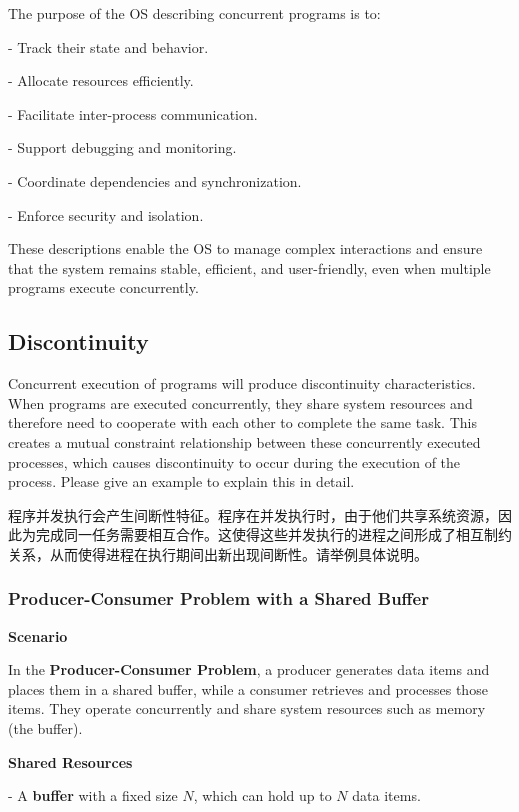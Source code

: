 \documentclass[a4paper]{book}
\begin{document}
The purpose of the OS describing concurrent programs is to:

- Track their state and behavior.

- Allocate resources efficiently.

- Facilitate inter-process communication.

- Support debugging and monitoring.

- Coordinate dependencies and synchronization.

- Enforce security and isolation.

These descriptions enable the OS to manage complex interactions and ensure that the system remains stable, efficient, and user-friendly, even when multiple programs execute concurrently.


\subsection{Discontinuity}

\begin{greenbox}
Concurrent execution of programs will produce discontinuity characteristics. When programs are executed concurrently, they share system resources and therefore need to cooperate with each other to complete the same task. This creates a mutual constraint relationship between these concurrently executed processes, which causes discontinuity to occur during the execution of the process. Please give an example to explain this in detail.
\end{greenbox}

程序并发执行会产生间断性特征。程序在并发执行时，由于他们共享系统资源，因此为完成同一任务需要相互合作。这使得这些并发执行的进程之间形成了相互制约关系，从而使得进程在执行期间出新出现间断性。请举例具体说明。 

\subsubsection{Producer-Consumer Problem with a Shared Buffer}

\textbf{Scenario}

In the \textbf{Producer-Consumer Problem}, a producer generates data items and places them in a shared buffer, while a consumer retrieves and processes those items. They operate concurrently and share system resources such as memory (the buffer). 

\textbf{Shared Resources}

- A \textbf{buffer} with a fixed size \( N \), which can hold up to \( N \) data items.
\end{document}
